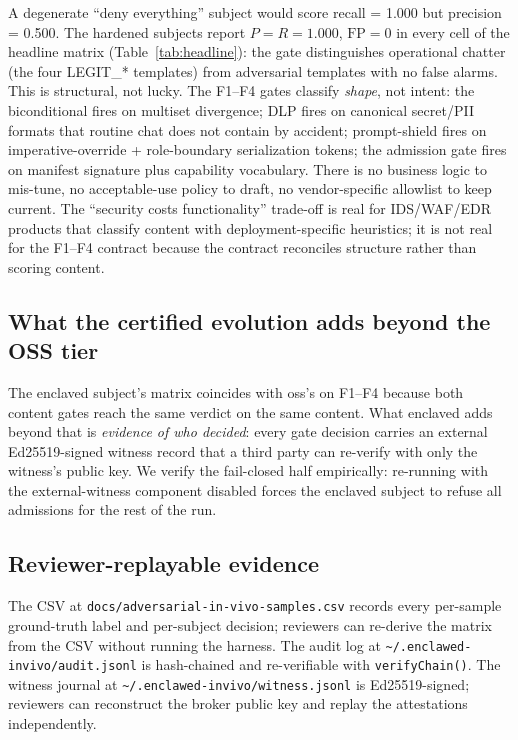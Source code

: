 \documentclass[11pt]{article}
\begin{document}
\begin{sloppypar}
A degenerate ``deny everything'' subject would score recall = 1.000
but precision = 0.500. The hardened subjects report
$P = R = 1.000$, $\mathrm{FP} = 0$ in every cell of the headline
matrix (Table~\ref{tab:headline}): the
gate distinguishes operational chatter (the four LEGIT\_*
templates) from adversarial templates with no false alarms. This is
structural, not lucky. The F1--F4 gates classify \emph{shape}, not
intent: the biconditional fires on multiset divergence; DLP fires on
canonical secret/PII formats that routine chat does not contain by
accident; prompt-shield fires on imperative-override + role-boundary
serialization tokens; the admission gate fires on manifest signature
plus capability vocabulary. There is no business logic to mis-tune,
no acceptable-use policy to draft, no vendor-specific allowlist to
keep current. The ``security costs functionality'' trade-off is real
for IDS/WAF/EDR products that classify content with
deployment-specific heuristics; it is not real for the F1--F4
contract because the contract reconciles structure rather than
scoring content.
\end{sloppypar}

\subsection{What the certified evolution adds beyond the OSS tier}

The enclaved subject's matrix coincides with oss's on F1--F4 because
both content gates reach the same verdict on the same content. What
enclaved adds beyond that is \emph{evidence of who decided}: every
gate decision carries an external Ed25519-signed witness record that
a third party can re-verify with only the witness's public key. We
verify the fail-closed half empirically: re-running with the
external-witness component disabled forces the enclaved subject to
refuse all admissions for the rest of the run.

\subsection{Reviewer-replayable evidence}

The CSV at \texttt{docs/adversarial-in-vivo-samples.csv} records every
per-sample ground-truth label and per-subject decision; reviewers can
re-derive the matrix from the CSV without running the harness. The
audit log at \texttt{\textasciitilde/.enclawed-invivo/audit.jsonl} is
hash-chained and re-verifiable with \texttt{verifyChain()}. The
witness journal at \texttt{\textasciitilde/.enclawed-invivo/witness.jsonl}
is Ed25519-signed; reviewers can reconstruct the broker public key
and replay the attestations independently.
\end{document}
